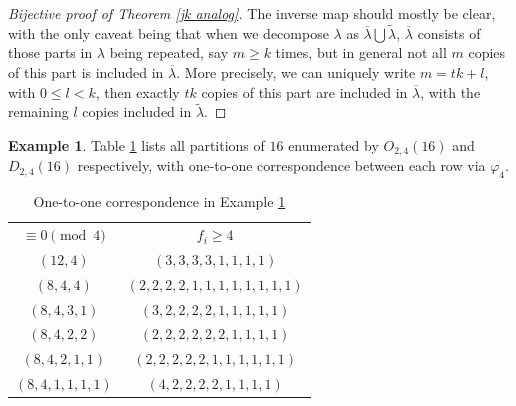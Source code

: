 \documentclass[12pt]{amsart}
\numberwithin{equation}{section}
\theoremstyle{plain}
\theoremstyle{definition}
\newtheorem{example}[theorem]{Example}
\begin{document}
\begin{proof}[Bijective proof of Theorem \ref{jk analog}]
The inverse map should mostly be clear, with the only caveat being that when we decompose $\lambda$ as $\overline{\lambda}\bigcup\widetilde{\lambda}$, $\overline{\lambda}$ consists of those parts in $\lambda$ being repeated, say $m\geq k$ times, but in general not all $m$ copies of this part is included in $\overline{\lambda}$. More precisely, we can uniquely write $m=tk+l$, with $0\leq l<k$, then exactly $tk$ copies of this part are included in $\overline{\lambda}$, with the remaining $l$ copies included in $\widetilde{\lambda}$.
\end{proof}
\begin{example}\label{exam2}
Table \ref{Tab2} lists all partitions of $16$ enumerated by $O_{2,4}(16)$ and $D_{2,4}(16)$ respectively, with one-to-one correspondence between each row via $\varphi_{4}$.
\end{example}
\begin{table}[tbp]\caption{One-to-one correspondence in Example \ref{exam2}}\label{Tab2}
\centering
\begin{tabular}{|c||c|}
$\equiv0\pmod{4}$ &$f_{i}\geq4$\\
$(12,4)$ &$(3,3,3,3,1,1,1,1)$\\
$(8,4,4)$ &$(2,2,2,2,1,1,1,1,1,1,1,1)$\\
$(8,4,3,1)$ &$(3,2,2,2,2,1,1,1,1,1)$\\
$(8,4,2,2)$ &$(2,2,2,2,2,2,1,1,1,1)$\\
$(8,4,2,1,1)$ &$(2,2,2,2,2,1,1,1,1,1,1)$\\
$(8,4,1,1,1,1)$ &$(4,2,2,2,2,1,1,1,1)$
\end{tabular}
\end{table}
\end{document}
